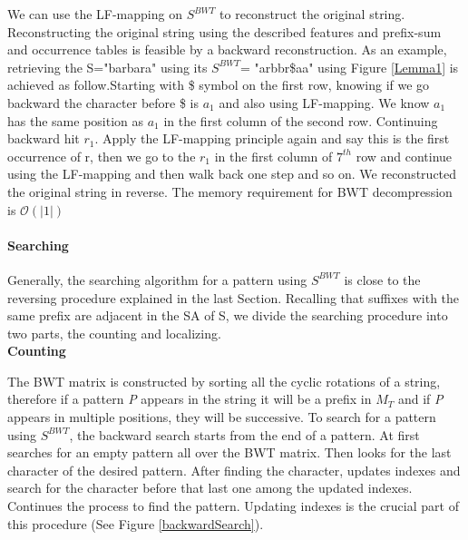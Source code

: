 \documentclass[11pt,a4paper]{report}
\begin{document}
We can use the LF-mapping on $S^{ BWT}$ to reconstruct the original string. 
Reconstructing the original string using the described features and prefix-sum
and occurrence tables is feasible by a backward reconstruction. As an example, 
retrieving the S="barbara" using its $S^{BWT}$= "arbbr\$aa" using Figure 
\ref{Lemma1} is achieved as follow.Starting with \$ symbol on the first row, 
knowing if we go backward the character before \$ is $a_1$ and also using 
LF-mapping. We know $a_1$ has the same position as $a_1$ in the first column of
the second row. Continuing backward hit $r_1$. Apply the LF-mapping principle 
again and say this is the first occurrence of r, then we go to the  $r_1$ in 
the first column of $7^{th}$ row and continue using the LF-mapping and then walk
back one step and so on. We reconstructed the original string in reverse. 
The memory requirement for BWT decompression is $\mathcal{O}(\lvert 1 \rvert)$ \\



\paragraph{Searching}

Generally, the searching algorithm for a pattern using $S^{BWT}$ is close to
the reversing procedure explained in the last Section. Recalling that suffixes 
with the same prefix are adjacent in the SA of S, we divide the searching procedure 
into two parts, the counting and localizing.\\


\textbf{Counting}

The BWT matrix is constructed by sorting all the cyclic rotations of a string, 
therefore if a pattern \emph{P} appears in the string it will be a prefix in $M_{T}$ 
and if \emph {P} appears in multiple positions, they will be successive. To search 
for a pattern using $S^{BWT}$, the backward search starts from the end of a pattern.
At first searches for an empty  pattern all over the BWT matrix. Then looks for the 
last character of the desired pattern. After finding the character, updates indexes 
and search for the character before that last one among the updated indexes.
Continues the process to find the pattern. Updating indexes is the crucial part 
of this procedure (See Figure \ref{backwardSearch}).\\\\
\end{document}

